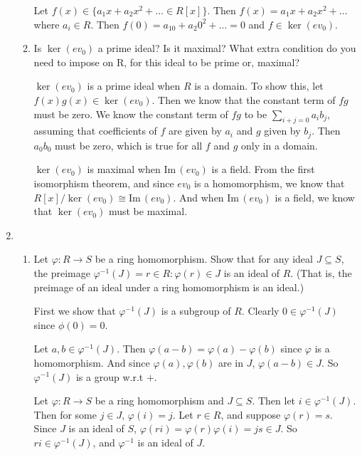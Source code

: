 \documentclass{article}
\begin{document}
\begin{enumerate}
\begin{enumerate}[label= (\alph*)]
            Let $f(x)\in \{a_1x+a_2x^2+\ldots\in R[x]\}$. Then $f(x)=a_1x+a_2x^2+\ldots$ where $a_i\in R$.
            Then $f(0)=a_10+a_2 0^2+\ldots=0$ and $f\in \ker(ev_0)$.

        \item Is $\ker(ev_0)$ a prime ideal? Is it maximal? What extra condition do you need to impose
        on R, for this ideal to be prime or, maximal?

        $\ker(ev_0)$ is a prime ideal when $R$ is a domain. To show this, let $f(x)g(x)\in \ker(ev_0)$.
        Then we know that the constant term of $fg$ must be zero. We know the constant term of
        $fg$ to be $\sum_{i+j=0}^{} a_ib_j$, assuming that coefficients of $f$ are given by $a_i$ and
        $g$ given by $b_j$. Then $a_0b_0$ must be zero, which is true for all $f$ and $g$ only 
        in a domain. 

        $\ker(ev_0)$ is maximal when $\mathrm{Im}\,(ev_0)$ is a field. From the first isomorphism theorem, and since
        $ev_0$ is a homomorphism, we know that $R[x] / \ker(ev_0)\cong \mathrm{Im}\,(ev_0)$. And when $\mathrm{Im}\,(ev_0)$ is
        a field, we know that $\ker(ev_0)$ must be maximal.

    \end{enumerate}
\item 
    \begin{enumerate}[label= (\alph*)] 
        \item   Let $\varphi:R\to  S$ be a ring homomorphism. Show that for any ideal $J \subseteq S$, the preimage
            $\varphi^{-1}(J) = {r \in  R : \varphi(r) \in  J}$ is an ideal of $R$. (That is, the preimage of 
            an ideal under a ring homomorphism is an ideal.)

            First we show that $\varphi^{-1}(J)$ is a subgroup of $R$. Clearly $0\in \varphi^{-1}(J)$
            since $\phi(0)=0$.

            Let $a,b\in \varphi^{-1}(J)$.
            Then $\varphi(a-b)=\varphi(a)-\varphi(b)$ since $\varphi$ is a homomorphism.
            And since $\varphi(a),\varphi(b)$ are in $J$, $\varphi(a-b)\in J$.
            So $\varphi^{-1}(J)$ is a group w.r.t $+$.

            Let $\varphi:R\to  S$ be a ring homomorphism and $J\subseteq S$.
            Then let $i\in \varphi^{-1}(J)$. Then for some $j\in J$, 
            $\varphi(i)=j$. Let $r\in R$, and suppose $\varphi(r)=s$. Since $J$ is an ideal of $S$, 
            $\varphi(ri)=\varphi(r)\varphi(i)=js\in J$. So $ri \in \varphi^{-1}(J)$, and 
            $\varphi^{-1}$ is an ideal of $J$.


\end{enumerate}
\end{enumerate}
\end{document}
